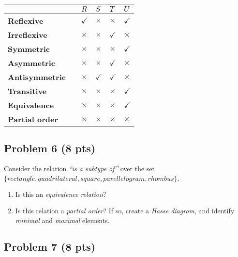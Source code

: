 \documentclass[12pt]{article}
\begin{document}
\begin{center}
\begin{tabular}{|l|l|l|l|l|l|}
\hline
						&	&	$R$	&	$S$	&	$T$	& $U$\\
\hline
\textbf{Reflexive} 	&	&	$\checkmark$ &	$\times$		&	$\times$ & $\checkmark$\\
\hline
\textbf{Irreflexive} 	&	&	$\times$ &	$\times$		&	$\checkmark$ &	$\times$	\\
\hline
\textbf{Symmetric} 	&	&	$\times$ &	$\times$ 	&	$\times$ &	$\checkmark$\\
\hline
\textbf{Asymmetric} 	&	&	$\times$ &	$\times$ 	&	$\checkmark$ &	$\times$\\
\hline
\textbf{Antisymmetric} &	&	$\times$ &	$\checkmark$	&	$\checkmark$ &	$\times$ \\
\hline
\textbf{Transitive} 	&	&	$\times$ &	$\times$ &	$\times$	&	$\checkmark$\\
\hline
\textbf{Equivalence} 	&	&	$\times$ &	$\times$ &	$\times$	&	$\checkmark$\\
\hline
\textbf{Partial order} 	&	&	$\times$ &	$\times$	&	$\times$	&	$\times$\\
\hline
\end{tabular}
\end{center}

\newpage

\subsection{Problem 6 (8 pts)}

\noindent Consider the relation \textit{``is a subtype of''} over the set \\
\indent \indent \indent $\{ rectangle, quadrilateral, square, parellelogram, rhombus\}$.

\begin{enumerate}

\item Is this an \textit{equivalence relation}?

\item Is this relation a \textit{partial order}? If so, create a \textit{Hasse diagram}, and identify \textit{minimal} and \textit{maximal} elements.

\end{enumerate}

\newpage

\subsection{Problem 7 (8 pts)}
\end{document}
